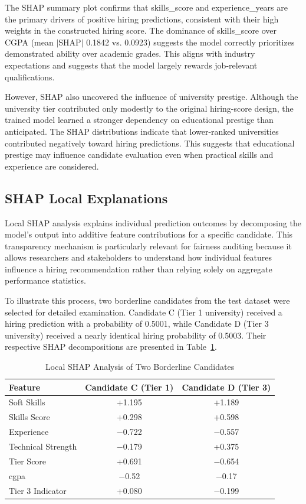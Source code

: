 \documentclass[conference]{IEEEtran}
\begin{document}
The SHAP summary plot confirms that skills\_score and experience\_years are the primary drivers of positive hiring predictions, consistent with their high weights in the constructed hiring score. The dominance of skills\_score over CGPA (mean $|$SHAP$|$ 0.1842 vs. 0.0923) suggests the model correctly prioritizes demonstrated ability over academic grades. This aligns with industry expectations and suggests that the model largely rewards job-relevant qualifications.

However, SHAP also uncovered the influence of university prestige. Although the university tier contributed only modestly to the original hiring-score design, the trained model learned a stronger dependency on educational prestige than anticipated. The SHAP distributions indicate that lower-ranked universities contributed negatively toward hiring predictions. This suggests that educational prestige may influence candidate evaluation even when practical skills and experience are considered.

\subsection{SHAP Local Explanations}

Local SHAP analysis explains individual prediction outcomes by decomposing the model's output into additive feature contributions for a specific candidate. This transparency mechanism is particularly relevant for fairness auditing because it allows researchers and stakeholders to understand how individual features influence a hiring recommendation rather than relying solely on aggregate performance statistics.

To illustrate this process, two borderline candidates from the test dataset were selected for detailed examination. Candidate C (Tier 1 university) received a hiring prediction with a probability of 0.5001, while Candidate D (Tier 3 university) received a nearly identical hiring probability of 0.5003. Their respective SHAP decompositions are presented in Table~\ref{tab:localshap}.

\begin{table}[htbp]
\caption{Local SHAP Analysis of Two Borderline Candidates}
\begin{center}
\begin{tabular}{|l|c|c|}
\hline
\textbf{Feature} & \textbf{Candidate C (Tier 1)} & \textbf{Candidate D (Tier 3)} \\
\hline
Soft Skills & +1.195 & +1.189 \\
\hline
Skills Score & +0.298 & +0.598 \\
\hline
Experience & $-$0.722 & $-$0.557 \\
\hline
Technical Strength & $-$0.179 & +0.375 \\
\hline
Tier Score & +0.691 & $-$0.654 \\
\hline
cgpa & $-$0.52 & $-$0.17 \\
\hline
Tier 3 Indicator & +0.080 & $-$0.199 \\
\hline
\end{tabular}
\label{tab:localshap}
\end{center}
\end{table}
\end{document}
